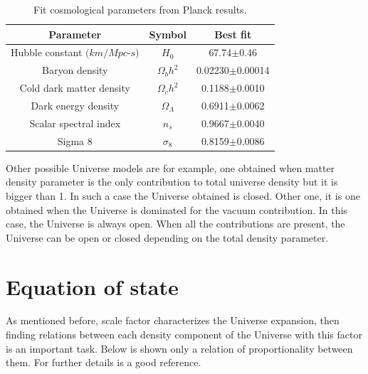 \begin{table}
\begin{center}
  \begin{tabular}{ | c | c | c |}
    \hline \hline
    Parameter & Symbol & Best fit \\ \hline \hline 
    Hubble constant $(km/Mpc$-$s)$ & $H_0$ & 67.74$\pm$0.46 \\ \hline
    Baryon density & $\Omega_b h^2$ &  0.02230$\pm$0.00014 \\ \hline
    Cold dark matter density & $\Omega_c h^2$ & 0.1188$\pm$0.0010 \\  \hline
    Dark energy density & $\Omega_\Lambda$ & 0.6911$\pm$0.0062 \\ \hline
    Scalar spectral index & $n_s$ & 0.9667$\pm$0.0040 \\ \hline
    Sigma 8 & $\sigma_8$& 0.8159$\pm$0.0086 \\ \hline
  \end{tabular}
    \caption{ Fit cosmological parameters from Planck results\cite{planck}.}
  \label{plancktable}
\end{center}
\end{table}

Other possible Universe models are for example, one obtained when matter
density parameter is the only contribution to total universe density but 
it is bigger than 1. In such a case the Universe obtained is closed. 
Other one, it is one obtained when the Universe is dominated for the vacuum
contribution. In this case, the Universe is always open. When all the 
contributions are present, the Universe can be open or closed depending on the
total density parameter. 
		
\section{ Equation of state }

As mentioned before, scale factor characterizes the Universe expansion, 
then finding relations between each density component of the Universe 
with this factor is an important task. Below is shown only a relation of proportionality 
between them. For further details \cite{padma} is a good reference. 

\

